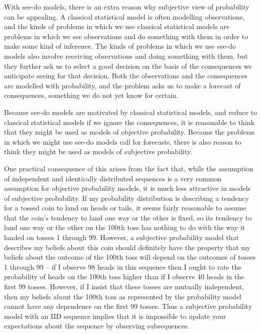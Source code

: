 With see-do models, there is an extra reason why subjective view of probability can be appealing. A classical statistical model is often modelling observations, and the kinds of problems in which we use classical statistical models are problems in which we see observations and do something with them in order to make some kind of inference. The kinds of problems in which we use see-do models also involve receiving observations and doing something with them, but they further ask us to select a good decision on the basis of the consequences we anticipate seeing for that decision. Both the observations and the consequences are modelled with probability, and the problem asks us to make a forecast of consequences, something we do not yet know for certain.

Because see-do models are motivated by classical statistical models, and reduce to classical statistical models if we ignore the consequences, it is reasonable to think that they might be used as models of objective probability. Because the problems in which we might use see-do models call for forecasts, there is also reason to think they might be used as models of subjective probability.

One practical consequence of this arises from the fact that, while the assumption of independent and identically distributed sequences is a very common assumption for objective probability models, it is much less attractive in models of subjective probability. If my probability distribution is describing a tendency for a tossed coin to land on heads or tails, it seems fairly reasonable to assume that the coin's tendency to land one way or the other is fixed, so its tendency to land one way or the other on the 100th toss has nothing to do with the way it landed on tosses 1 through 99. However, a subjective probability model that describes my beliefs about this coin should definitely have the property that my beliefs about the outcome of the 100th toss will depend on the outcomes of tosses 1 through 99 -- if I observe 98 heads in this sequence then I ought to rate the probability of heads on the 100th toss higher than if I observe 40 heads in the first 99 tosses. However, if I insist that these tosses are mutually independent, then my beliefs about the 100th toss as represented by the probability model cannot have any dependence on the first 99 tosses. Thus a subjective probability model with an IID sequence implies that it is impossible to update your expectations about the sequence by observing subsequences.

